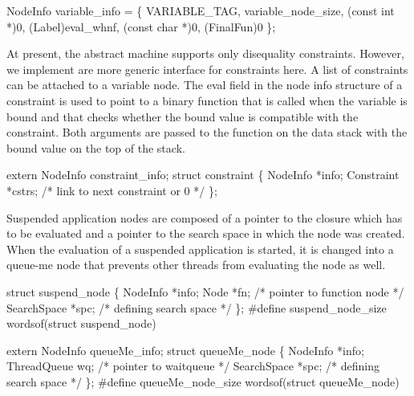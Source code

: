 \nwendcode{}\nwdocspar
\nwenddocs{}\plusendmoddef\nwstartdeflinemarkup{}\nwenddeflinemarkup
NodeInfo variable_info = \{
    VARIABLE_TAG, variable_node_size, (const int *)0, (Label)eval_whnf,
    (const char *)0, (FinalFun)0
\};

\nwendcode{}\nwdocspar
At present, the abstract machine supports only disequality constraints.
However, we implement are more generic interface for constraints here.
A list of constraints can be attached to a variable node. The {\Tt{}eval\nwendquote}
field in the node info structure of a constraint is used to point to a
binary function that is called when the variable is bound and that
checks whether the bound value is compatible with the constraint. Both
arguments are passed to the function on the data stack with the bound
value on the top of the stack.

\nwenddocs{}\plusendmoddef\nwstartdeflinemarkup{}\nwenddeflinemarkup
extern NodeInfo constraint_info;
struct constraint \{
    NodeInfo   *info;
    Constraint *cstrs;          /* link to next constraint or 0 */
\};

\nwendcode{}\nwdocspar
Suspended application nodes are composed of a pointer to the closure
which has to be evaluated and a pointer to the search space in which
the node was created. When the evaluation of a suspended application
is started, it is changed into a queue-me node that prevents other
threads from evaluating the node as well.

\nwenddocs{}\plusendmoddef\nwstartdeflinemarkup{}\nwenddeflinemarkup
struct suspend_node \{
    NodeInfo    *info;
    Node        *fn;            /* pointer to function node */
    SearchSpace *spc;           /* defining search space */
\};
#define suspend_node_size       wordsof(struct suspend_node)

extern NodeInfo queueMe_info;
struct queueMe_node \{
    NodeInfo    *info;
    ThreadQueue wq;             /* pointer to waitqueue */
    SearchSpace *spc;           /* defining search space */
\};
#define queueMe_node_size       wordsof(struct queueMe_node)

